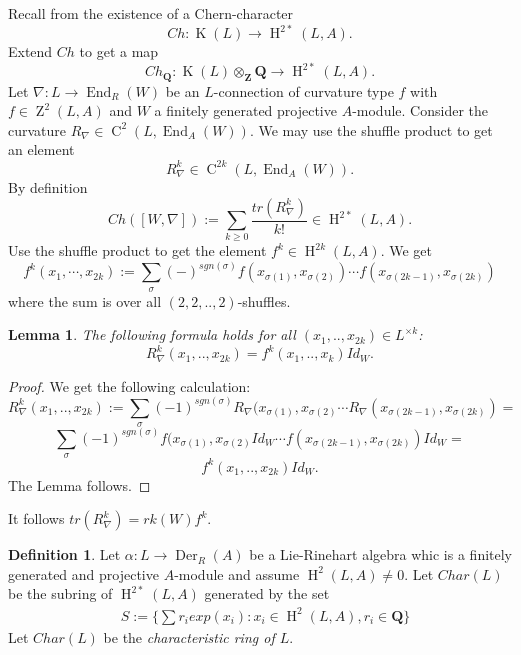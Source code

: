 \documentclass{amsart}
\theoremstyle{plain}
\newtheorem{lemma}[theorem]{Lemma}
\theoremstyle{definition}
\newtheorem{definition}[theorem]{Definition}
\theoremstyle{remark}
\numberwithin{equation}{theorem}
\begin{document}
Recall from \cite{maa2} the existence of a Chern-character
\[ Ch: {\operatorname{K}}(L)\rightarrow {\operatorname{H} }^{2*}(L,{A}).\]
Extend $Ch$ to get a map
\[ Ch_{\mathbf{Q}}:{\operatorname{K}}(L)\otimes_{\mathbf{Z}}\mathbf{Q}\rightarrow {\operatorname{H} }^{2*}(L,{A}).\]
Let $\nabla:L\rightarrow {\operatorname{End} }_{R}(W)$ be an $L$-connection of curvature type $f$ with $f\in {\operatorname{Z}}^2(L,{A})$ 
and $W$ a finitely generated projective ${A}$-module. Consider
the curvature $R_{\nabla}\in {\operatorname{C} }^2(L, {\operatorname{End} }_{A}(W))$. We may use the shuffle product to get an element
\[ R_{\nabla}^k \in {\operatorname{C} }^{2k}(L,{\operatorname{End} }_{A}(W)).\]
By definition
\[ Ch([W,\nabla]):=\sum_{k\geq 0} \frac{tr(R_{\nabla}^k)}{k!}\in {\operatorname{H} }^{2*}(L,{A}).\]
Use the shuffle product to get the element $f^k\in {\operatorname{H} }^{2k}(L,{A})$. We get
\[f^k(x_1,\cdots ,x_{2k}):=\sum_{\sigma}(-)^{sgn(\sigma)}f(x_{\sigma(1)},x_{\sigma(2)})\cdots
f(x_{\sigma(2k-1)},x_{\sigma(2k)})\]
where the sum is over all $(2,2,..,2)$-shuffles.

\begin{lemma} The following formula holds for all $(x_1,..,x_{2k})\in L^{\times k}$:
\[ R_{\nabla}^k(x_1,..,x_{2k})=f^k(x_1,..,x_k)Id_W.\]
\end{lemma}
\begin{proof} We get the following calculation:
\[ R_{\nabla}^k(x_1,..,x_{2k}):=\sum_{\sigma}(-1)^{sgn(\sigma)}R_{\nabla}(x_{\sigma(1)},x_{\sigma(2)}\cdots
R_{\nabla}(x_{\sigma(2k-1)},x_{\sigma(2k)})=\]
\[ \sum_{\sigma}(-1)^{sgn(\sigma)}f(x_{\sigma(1)},x_{\sigma(2)}Id_W \cdots f(x_{\sigma(2k-1)},x_{\sigma(2k)})Id_W=\]
\[ f^k(x_1,..,x_{2k})Id_W.\]
The Lemma follows.
\end{proof}

It follows $tr(R_{\nabla}^k)=rk(W)f^k $.

\begin{definition} 
Let $\alpha:L\rightarrow {\operatorname{Der} }_R(A)$ be a Lie-Rinehart algebra whic is a finitely generated and projective ${A}$-module and
assume ${\operatorname{H} }^2(L,{A})\neq 0$. Let $Char(L)$ be the subring of ${\operatorname{H} }^{2*}(L,{A})$ generated by the set
\begin{align}
&\label{setL} S:= \{ \sum r_i exp(x_i): x_i\in {\operatorname{H} }^2(L,{A}), r_i\in \mathbf{Q} \}
\end{align}
Let $Char(L)$ be the \emph{characteristic ring of $L$}.
\end{definition}
\end{document}
